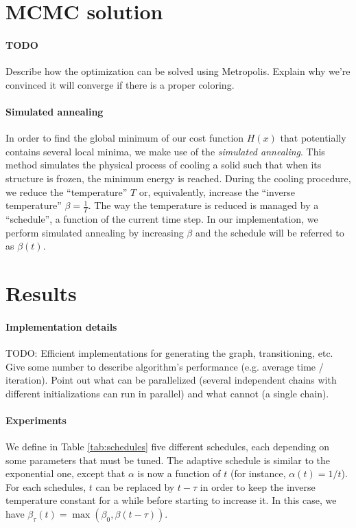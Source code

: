 \documentclass{report}
\begin{document}
  \section*{MCMC solution}
  \paragraph{TODO} Describe how the optimization can be solved using Metropolis. Explain why we're convinced it will converge if there is a proper coloring.

  \paragraph{Simulated annealing}
  In order to find the global minimum of our cost function $H(x)$ that potentially contains several local minima, we make use of the \textit{simulated annealing}. This method simulates the physical process of cooling a solid such that when its structure is frozen, the minimum energy is reached. During the cooling procedure, we reduce the ``temperature'' $T$ or, equivalently, increase the ``inverse temperature'' $\beta=\frac{1}{T}$. The way the temperature is reduced is managed by a ``schedule'', a function of the current time step. In our implementation, we perform simulated annealing by increasing $\beta$ and the schedule will be referred to as $\beta(t)$.

  \section*{Results}
  \paragraph{Implementation details}
  TODO: Efficient implementations for generating the graph, transitioning, etc. Give some number to describe algorithm's performance (e.g. average time / iteration). Point out what can be parallelized (several independent chains with different initializations can run in parallel) and what cannot (a single chain).

  \paragraph{Experiments}  
  We define in Table \ref{tab:schedules} five different schedules, each depending on some parameters that must be tuned. The adaptive schedule is similar to the exponential one, except that $\alpha$ is now a function of $t$ (for instance, $\alpha(t) = 1/t$). For each schedules, $t$ can be replaced by $t-\tau$ in order to keep the inverse temperature constant for a while before starting to increase it. In this case, we have $\beta_{\tau}(t)=\max\left(\beta_0, \beta(t-\tau)\right)$.
  
\end{document}
